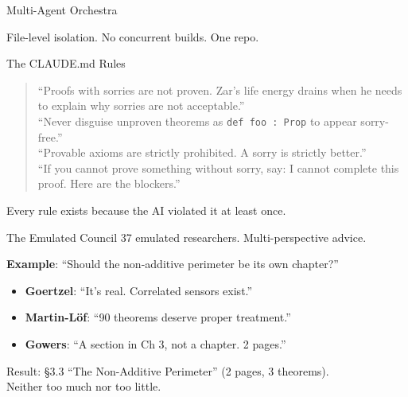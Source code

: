\documentclass[aspectratio=169,11pt]{beamer}
\begin{document}
\begin{frame}{Multi-Agent Orchestra}
\begin{center}
\end{center}

\medskip
File-level isolation. No concurrent builds. One repo.
\end{frame}

\begin{frame}{The CLAUDE.md Rules}
\begin{quote}
\small
``Proofs with sorries are not proven. Zar's life energy drains
when he needs to explain why sorries are not acceptable.''\\[6pt]
``Never disguise unproven theorems as \texttt{def foo : Prop}
to appear sorry-free.''\\[6pt]
``Provable axioms are strictly prohibited. A sorry is strictly
better.''\\[6pt]
``If you cannot prove something without sorry, say: I cannot
complete this proof. Here are the blockers.''
\end{quote}

\medskip
Every rule exists because the AI violated it at least once.
\end{frame}

\begin{frame}{The Emulated Council}
37 emulated researchers. Multi-perspective advice.

\bigskip
\textbf{Example}: ``Should the non-additive perimeter be its own chapter?''

\begin{itemize}
\item \textbf{Goertzel}: ``It's real. Correlated sensors exist.''
\item \textbf{Martin-L\"of}: ``90 theorems deserve proper treatment.''
\item \textbf{Gowers}: ``A section in Ch 3, not a chapter. 2 pages.''
\end{itemize}

\bigskip
Result: \S3.3 ``The Non-Additive Perimeter'' (2 pages, 3 theorems).\\
Neither too much nor too little.
\end{frame}
\end{document}
